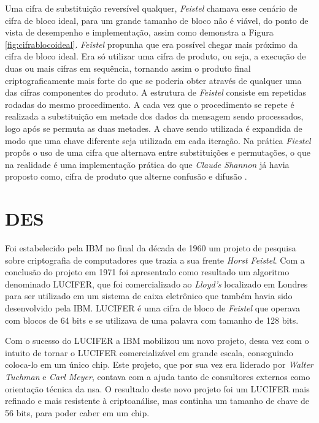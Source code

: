 Uma cifra de substituição reversível qualquer, \textit{Feistel} chamava esse cenário de cifra de bloco ideal, para um grande tamanho de bloco não é viável, do ponto de vista de desempenho e implementação, assim como demonstra a Figura \ref{fig:cifrablocoideal}. \textit{Feistel} propunha que era possível chegar mais próximo da cifra de bloco ideal. Era só utilizar uma cifra de produto, ou seja, a execução de duas ou mais cifras em sequência, tornando assim o produto final criptograficamente mais forte do que se poderia obter através de qualquer uma das cifras componentes do produto. A estrutura de \textit{Feistel} consiste em repetidas rodadas do mesmo procedimento. A cada vez que o procedimento se repete é realizada a substituição em metade dos dados da mensagem sendo processados, logo após se permuta as duas metades. A chave sendo utilizada é expandida de modo que uma chave diferente seja utilizada em cada iteração. Na prática \textit{Fiestel} propôs o uso de uma cifra que alternava entre substituições e permutações, o que na realidade é uma implementação prática do que \textit{Claude Shannon} já havia proposto como, cifra de produto que alterne confusão e difusão \cite{stallings14}.

\section{DES}
\label{sec:des}
Foi estabelecido pela IBM no final da década de 1960 um projeto de pesquisa sobre criptografia de computadores que trazia a sua frente \textit{Horst Feistel}. Com a conclusão do projeto em 1971 foi apresentado como resultado um algoritmo denominado LUCIFER, que foi comercializado ao \textit{Lloyd’s} localizado em Londres para ser utilizado em um sistema de caixa eletrônico que também havia sido desenvolvido pela IBM. LUCIFER é uma cifra de bloco de \textit{Feistel} que operava com blocos de 64 bits e se utilizava de uma palavra com tamanho de 128 bits.

Com o sucesso do LUCIFER a IBM mobilizou um novo projeto, dessa vez com o intuito de tornar o LUCIFER comercializável em grande escala, conseguindo coloca-lo em um único chip. Este projeto, que por sua vez era liderado por \textit{Walter Tuchman} e \textit{Carl Meyer}, contava com a ajuda tanto de consultores externos como orientação técnica da \acrfull{nsa}. O resultado deste novo projeto foi um LUCIFER mais refinado e mais resistente à criptoanálise, mas continha um tamanho de chave de 56 bits, para poder caber em um chip.

